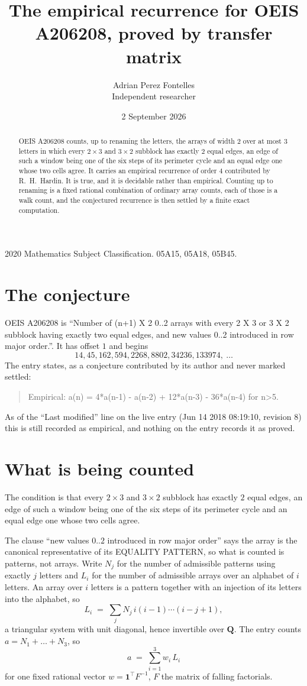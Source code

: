 \documentclass[11pt,a4paper]{article}
\title{The empirical recurrence for OEIS A206208, proved by transfer matrix}
\author{Adrian Perez Fontelles\\ \small Independent researcher}
\date{2 September 2026}
\theoremstyle{plain}
\theoremstyle{definition}
\begin{document}
\maketitle

\begin{abstract}
OEIS A206208 counts, up to renaming the letters, the arrays of width $2$ over at most $3$
letters in which every $2\times3$ and $3\times2$ subblock has exactly $2$ equal edges, an edge of such a window being one of the six steps of its perimeter cycle and an equal edge one whose two cells agree. It carries an empirical recurrence of order $4$ contributed by
R.~H.~Hardin. It is true, and it is decidable rather than empirical. Counting up to renaming is
a fixed rational combination of ordinary array counts, each of those is a walk count, and the
conjectured recurrence is then settled by a finite exact computation.
\end{abstract}

\noindent\small 2020 Mathematics Subject Classification. 05A15, 05A18, 05B45.\normalsize

\section{The conjecture}

OEIS A206208 is ``Number of (n+1) X 2 0..2 arrays with every 2 X 3 or 3 X 2 subblock having exactly two equal edges, and new values 0..2 introduced in row major order.''. It has offset $1$ and begins
\[
14, 45, 162, 594, 2268, 8802, 34236, 133974,\ \dots
\]
The entry states, as a conjecture contributed by its author and never marked settled:
\begin{quote}
Empirical: a(n) = 4*a(n-1) - a(n-2) + 12*a(n-3) - 36*a(n-4) for n>5.
\end{quote}
As of the ``Last modified'' line on the live entry (Jun 14 2018 08:19:10, revision 8) this is still
recorded as empirical, and nothing on the entry records it as proved.

\section{What is being counted}

The condition is that every $2\times3$ and $3\times2$ subblock has exactly $2$ equal edges, an edge of such a window being one of the six steps of its perimeter cycle and an equal edge one whose two cells agree.

The clause ``new values $0..2$ introduced in row major order'' says the array is the
canonical representative of its EQUALITY PATTERN, so what is counted is patterns, not arrays.
Write $N_j$ for the number of admissible patterns using exactly $j$ letters and $L_i$ for the
number of admissible arrays over an alphabet of $i$ letters. An array over $i$ letters is a
pattern together with an injection of its letters into the alphabet, so
\[
L_i\;=\;\sum_j N_j\,i(i-1)\cdots(i-j+1),
\]
a triangular system with unit diagonal, hence invertible over $\mathbf{Q}$. The entry counts
$a=N_1+\dots+N_{3}$, so
\[
a\;=\;\sum_{i=1}^{3}w_i\,L_i
\]
for one fixed rational vector $w=\mathbf{1}^{\!\top}F^{-1}$, $F$ the matrix of falling
factorials.
\end{document}
